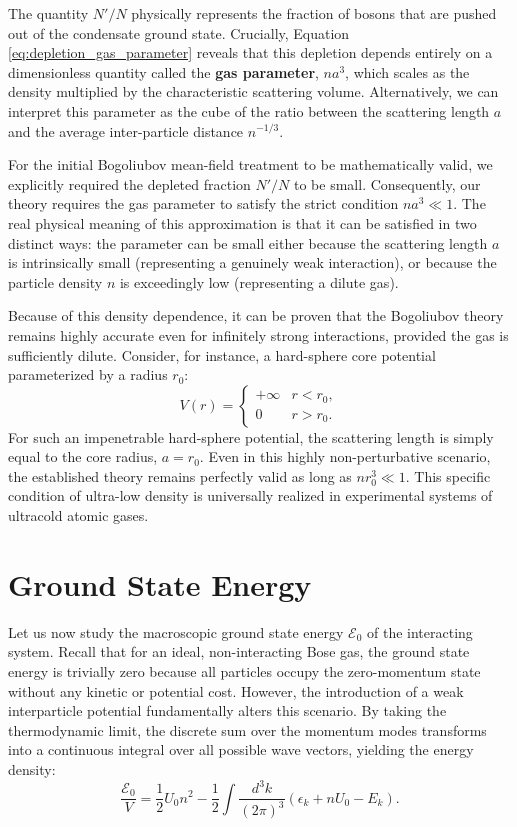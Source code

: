 The quantity \( N'/N \) physically represents the fraction of bosons that are pushed out of the condensate ground state. Crucially, Equation \ref{eq:depletion_gas_parameter} reveals that this depletion depends entirely on a dimensionless quantity called the \textbf{gas parameter}, \( n a^3 \), which scales as the density multiplied by the characteristic scattering volume. Alternatively, we can interpret this parameter as the cube of the ratio between the scattering length \( a \) and the average inter-particle distance \( n^{-1/3} \).

For the initial Bogoliubov mean-field treatment to be mathematically valid, we explicitly required the depleted fraction \( N'/N \) to be small. Consequently, our theory requires the gas parameter to satisfy the strict condition \( n a^3 \ll 1 \). The real physical meaning of this approximation is that it can be satisfied in two distinct ways: the parameter can be small either because the scattering length \( a \) is intrinsically small (representing a genuinely weak interaction), or because the particle density \( n \) is exceedingly low (representing a dilute gas).

Because of this density dependence, it can be proven that the Bogoliubov theory remains highly accurate even for infinitely strong interactions, provided the gas is sufficiently dilute. Consider, for instance, a hard-sphere core potential parameterized by a radius \( r_0 \):
\[
    V(r) = \begin{cases}
        +\infty & r < r_0, \\
        0       & r > r_0.
    \end{cases}
\]
For such an impenetrable hard-sphere potential, the scattering length is simply equal to the core radius, \( a = r_0 \). Even in this highly non-perturbative scenario, the established theory remains perfectly valid as long as \( n r_0^3 \ll 1 \). This specific condition of ultra-low density is universally realized in experimental systems of ultracold atomic gases.

\section{Ground State Energy}

Let us now study the macroscopic ground state energy \( \mathcal{E}_0 \) of the interacting system. Recall that for an ideal, non-interacting Bose gas, the ground state energy is trivially zero because all particles occupy the zero-momentum state without any kinetic or potential cost. However, the introduction of a weak interparticle potential fundamentally alters this scenario. By taking the thermodynamic limit, the discrete sum over the momentum modes transforms into a continuous integral over all possible wave vectors, yielding the energy density:
\[
    \frac{\mathcal{E}_0}{V} = \frac{1}{2}U_0 n^2 - \frac{1}{2} \int \frac{d^3k}{(2\pi)^3} (\epsilon_k + nU_0 - E_k).
\]

